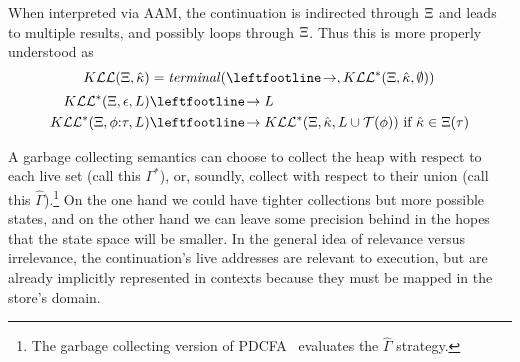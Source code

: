 When interpreted via AAM, the continuation is indirected through $\Xi$ and leads to multiple results, and possibly loops through $\Xi$.
%
Thus this is more properly understood as
\begin{align*}
  \kontlive(\mktab,\makont) &= \terminal(\stepto, \kontliveaux(\mktab,\makont,\emptyset)) \\[2pt]
  \kontliveaux(\mktab,\epsilon,L) &\stepto L \\
  \kontliveaux(\mktab,\kcons{\mkframe}{\mctx}, L) &\stepto \kontliveaux(\mktab,\makont, L\cup\touches(\mkframe)) \text{ if } \makont \in \mktab(\mctx)
\end{align*}
%

A garbage collecting semantics can choose to collect the heap with respect to each live set (call this $\Gamma^*$), or, soundly, collect with respect to their union (call this $\hat\Gamma$).\footnote{The garbage collecting version of PDCFA~\citep{ianjohnson:DBLP:journals/jfp/JohnsonSEMH14} evaluates the $\hat\Gamma$ strategy.}
%
On the one hand we could have tighter collections but more possible states, and on the other hand we can leave some precision behind in the hopes that the state space will be smaller.
%
In the general idea of relevance versus irrelevance, the continuation's live addresses are relevant to execution, but are already implicitly represented in contexts because they must be mapped in the store's domain.

